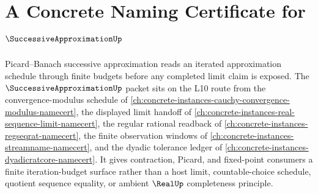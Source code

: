 \chapter{A Concrete Naming Certificate for $\SuccessiveApproximationUp$}
\label{ch:concrete-instances-successiveapproximation-namecert}

Picard--Banach successive approximation reads an iterated approximation schedule through finite budgets before any completed limit claim is exposed. The $\SuccessiveApproximationUp$ packet sits on the L10 route from the convergence-modulus schedule of \autoref{ch:concrete-instances-cauchy-convergence-modulus-namecert}, the displayed limit handoff of \autoref{ch:concrete-instances-real-sequence-limit-namecert}, the regular rational readback of \autoref{ch:concrete-instances-regseqrat-namecert}, the finite observation windows of \autoref{ch:concrete-instances-streamname-namecert}, and the dyadic tolerance ledger of \autoref{ch:concrete-instances-dyadicratcore-namecert}. It gives contraction, Picard, and fixed-point consumers a finite iteration-budget surface rather than a host limit, countable-choice schedule, quotient sequence equality, or ambient $\RealUp$ completeness principle.


